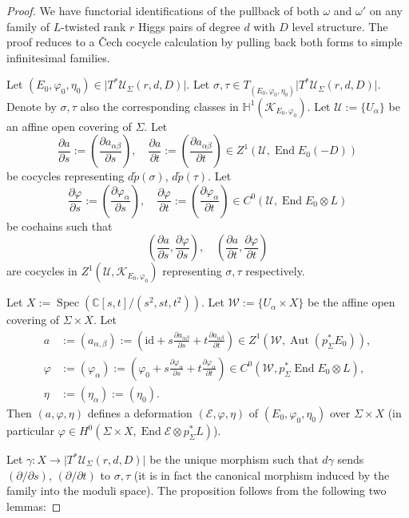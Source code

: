 \documentclass[12pt,a4paper,oneside,english]{smfart}
\theoremstyle{definition}
\theoremstyle{remark}
\DeclareMathOperator{\End}{End}
\DeclareMathOperator{\Aut}{Aut}
\DeclareMathOperator{\Spec}{Spec}
\newcommand{\cU}{\mathcal{U}}
\newcommand{\cE}{\mathcal{E}}
\newcommand{\KK}{\mathscr{K}}
\newcommand{\HH}{\mathbb{H}}
\newcommand{\tot}[1]{\lvert #1 \rvert}
\begin{document}
\begin{proof}
We have functorial identifications of the pullback of both $\omega$ and $\omega'$ on any family of $L$-twisted rank $r$ Higgs pairs of degree $d$ with $D$ level structure. The proof reduces to a \v{C}ech cocycle calculation by pulling back both forms to simple infinitesimal families.

Let $(E_0, \varphi_0, \eta_0) \in \tot{T^*\cU_\Sigma(r, d, D)}$. Let $\sigma, \tau \in T_{(E_0, \varphi_0, \eta_0)}\tot{T^*\cU_\Sigma(r, d, D)}$. Denote by $\sigma, \tau$ also the corresponding classes in $\HH^1(\KK_{E_0, \varphi_0})$. Let $\mathcal{U} := \{U_\alpha\}$ be an affine open covering of $\Sigma$. Let
\[
\frac{\partial a}{\partial s} := \left(\frac{\partial a_{\alpha \beta}}{\partial s}\right), \quad \frac{\partial a}{\partial t} := \left(\frac{\partial a_{\alpha \beta}}{\partial t}\right) \in Z^1(\mathcal{U}, \End E_0(-D))
\]
be cocycles representing $d\tilde{p}(\sigma)$, $d\tilde{p}(\tau)$. Let
\[
\frac{\partial \varphi}{\partial s} := \left(\frac{\partial \varphi_\alpha}{\partial s}\right), \quad \frac{\partial \varphi}{\partial t} := \left(\frac{\partial \varphi_\alpha}{\partial t}\right) \in C^0(\mathcal{U}, \End E_0 \otimes L)
\]
be cochains such that
\[
\left(\frac{\partial a}{\partial s}, \frac{\partial \varphi}{\partial s}\right), \quad \left(\frac{\partial a}{\partial t}, \frac{\partial \varphi}{\partial t}\right)
\]
are cocycles in $Z^1(\mathcal{U}, \KK_{E_0, \varphi_0})$ representing $\sigma, \tau$ respectively.

Let $X := \Spec(\mathbb{C}[s, t]/(s^2, st, t^2))$. Let $\mathcal{W} := \{U_\alpha \times X\}$ be the affine open covering of $\Sigma \times X$. Let
\begin{align*}
a &:= (a_{\alpha, \beta}) := \left(\mathrm{id} + s \frac{\partial a_{\alpha \beta}}{\partial s} + t \frac{\partial a_{\alpha \beta}}{\partial t}\right) \in Z^1(\mathcal{W}, \Aut(p_\Sigma^* E_0)), \\
\varphi &:= (\varphi_\alpha) := \left(\varphi_0 + s \frac{\partial \varphi_\alpha}{\partial s} + t \frac{\partial \varphi_\alpha}{\partial t}\right) \in C^0(\mathcal{W}, p_\Sigma^* \End E_0 \otimes L), \\
\eta &:= (\eta_\alpha) := (\eta_0).
\end{align*}
Then $(a, \varphi, \eta)$ defines a deformation $(\cE, \varphi, \eta)$ of $(E_0, \varphi_0, \eta_0)$ over $\Sigma \times X$ (in particular $\varphi \in H^0(\Sigma \times X, \End \cE \otimes p_\Sigma^* L)$).

Let $\gamma \colon X \to \tot{T^*\cU_\Sigma(r, d, D)}$ be the unique morphism such that $d\gamma$ sends $(\partial/\partial s)$, $(\partial/\partial t)$ to $\sigma, \tau$ (it is in fact the canonical morphism induced by the family into the moduli space). The proposition follows from the following two lemmas:
\end{proof}
\end{document}

